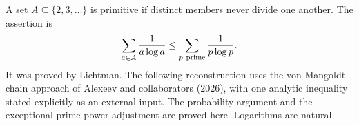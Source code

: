 A set $A\subseteq\{2,3,\ldots\}$ is primitive if distinct members never
divide one another. The assertion is
\[
 \sum_{a\in A}\frac1{a\log a}
 \leq \sum_{p\ {\rm prime}}\frac1{p\log p}.
\]
It was proved by Lichtman. The following reconstruction uses the von
Mangoldt-chain approach of Alexeev and collaborators (2026), with one
analytic inequality stated explicitly as an external input. The
probability argument and the exceptional prime-power adjustment are
proved here. Logarithms are natural.
